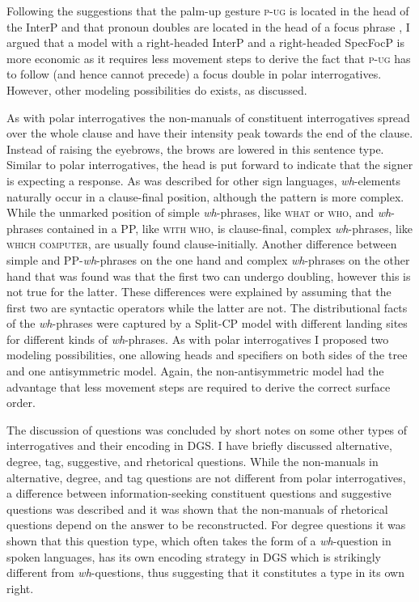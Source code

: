 Following the suggestions that the palm-up gesture \textsc{p-ug} is located in the head of the InterP \citep{aboh2010sa} and that pronoun doubles are located in the head of a focus phrase \citep{de1999phrase, sandler2006sign}, I argued that a model with a right-headed InterP and a right-headed SpecFocP is more economic as it requires less movement steps to derive the fact that \textsc{p-ug} has to follow (and hence cannot precede) a focus double in polar interrogatives. However, other modeling possibilities do exists, as discussed.

As with polar interrogatives the non-manuals of constituent interrogatives spread over the whole clause and have their intensity peak towards the end of the clause. Instead of raising the eyebrows, the brows are lowered in this sentence type. Similar to polar interrogatives, the head is put forward to indicate that the signer is expecting a response. As was described for other sign languages, \textit{wh}-elements naturally occur in a clause-final position, although the pattern is more complex. While the unmarked position of simple \textit{wh}-phrases, like \textsc{what} or \textsc{who}, and \textit{wh}-phrases contained in a PP, like \textsc{with who}, is clause-final, complex \textit{wh}-phrases, like \textsc{which computer}, are usually found clause-initially. Another difference between simple and PP-\textit{wh}-phrases on the one hand and complex \textit{wh}-phrases on the other hand that was found was that the first two can undergo doubling, however this is not true for the latter. These differences were explained by assuming that the first two are syntactic operators while the latter are not. The distributional facts of the \textit{wh}-phrases were captured by a Split-CP model with different landing sites for different kinds of \textit{wh}-phrases. As with polar interrogatives I proposed two modeling possibilities, one allowing heads and specifiers on both sides of the tree and one antisymmetric model. Again, the non-antisymmetric model had the advantage that less movement steps are required to derive the correct surface order.

The discussion of questions was concluded by short notes on some other types of interrogatives and their encoding in DGS. I have briefly discussed alternative, degree, tag, suggestive, and rhetorical questions. While the non-manuals in alternative, degree, and tag questions are not different from polar interrogatives, a difference between information-seeking constituent questions and suggestive questions was described and it was shown that the non-manuals of rhetorical questions depend on the answer to be reconstructed. For degree questions it was shown that this question type, which often takes the form of a \textit{wh}-question in spoken languages, has its own encoding strategy in DGS which is strikingly different from \textit{wh}-questions, thus suggesting that it constitutes a type in its own right. 

